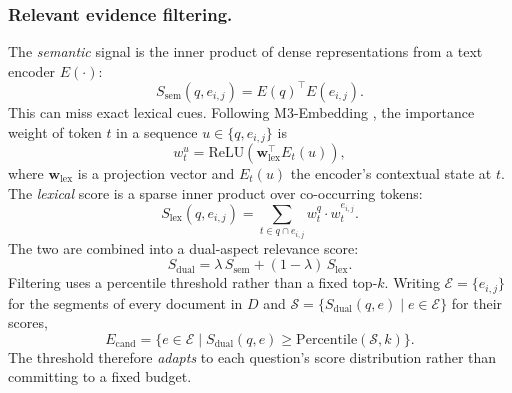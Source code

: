 \documentclass{llncs}
\begin{document}
\subsubsection{Relevant evidence filtering.}
The \emph{semantic} signal is the inner product of dense representations from a
text encoder $E(\cdot)$:
\begin{equation}
S_{\text{sem}}(q, e_{i,j}) = E(q)^\top E(e_{i,j}).
\end{equation}
This can miss exact lexical cues. Following M3-Embedding
\cite{chen2024bgem3}, the importance weight of token $t$ in a sequence
$u \in \{q, e_{i,j}\}$ is
\begin{equation}
w_t^{u} = \mathrm{ReLU}(\mathbf{w}_{\text{lex}}^\top E_t(u)),
\end{equation}
where $\mathbf{w}_{\text{lex}}$ is a projection vector and $E_t(u)$ the encoder's
contextual state at $t$. The \emph{lexical} score is a sparse
inner product over co-occurring tokens:
\begin{equation}
S_{\text{lex}}(q, e_{i,j}) = \sum_{t \in q \cap e_{i,j}} w_t^{q} \cdot w_t^{e_{i,j}}.
\end{equation}
The two are combined into a dual-aspect relevance score:
\begin{equation}
S_{\text{dual}} = \lambda \, S_{\text{sem}} + (1-\lambda) \, S_{\text{lex}}.
\label{eq:dual}
\end{equation}
Filtering uses a percentile threshold rather than a fixed top-$k$. Writing
$\mathcal{E} = \{ e_{i,j} \}$ for the segments of every document in $D$ and
$\mathcal{S} = \{ S_{\text{dual}}(q, e) \mid e \in \mathcal{E} \}$ for their scores,
\begin{equation}
E_{\text{cand}} = \{ e \in \mathcal{E} \mid S_{\text{dual}}(q, e) \ge \mathrm{Percentile}(\mathcal{S}, k) \}.
\label{eq:pct}
\end{equation}
The threshold therefore \emph{adapts} to each question's score distribution
rather than committing to a fixed budget.
\end{document}

